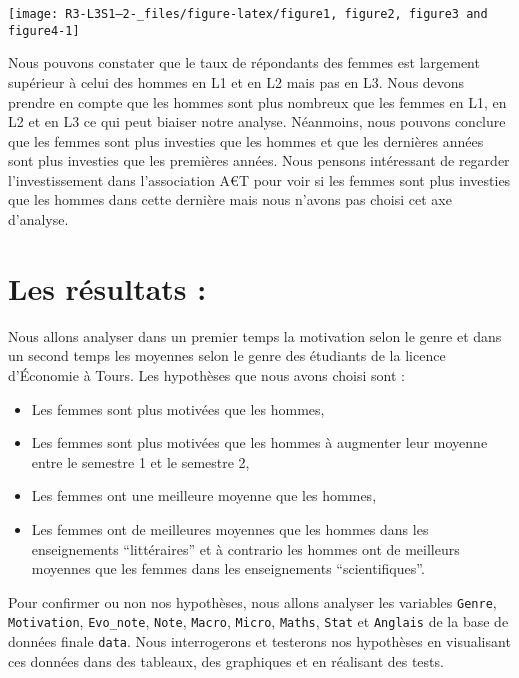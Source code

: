 \documentclass[
  11pt,
  french,
]{article}
\providecommand{\tightlist}{%
  \setlength{\itemsep}{0pt}\setlength{\parskip}{0pt}}
\begin{document}
\begin{center}\texttt{[image: R3-L3S1--2-\_files/figure-latex/figure1, figure2, figure3 and figure4-1]} \end{center}

Nous pouvons constater que le taux de répondants des femmes est
largement supérieur à celui des hommes en L1 et en L2 mais pas en L3.
Nous devons prendre en compte que les hommes sont plus nombreux que les
femmes en L1, en L2 et en L3 ce qui peut biaiser notre analyse.
Néanmoins, nous pouvons conclure que les femmes sont plus investies que
les hommes et que les dernières années sont plus investies que les
premières années. Nous pensons intéressant de regarder l'investissement
dans l'association A€T pour voir si les femmes sont plus investies que
les hommes dans cette dernière mais nous n'avons pas choisi cet axe
d'analyse.

\hypertarget{les-ruxe9sultats}{%
\section{Les résultats :}\label{les-ruxe9sultats}}

Nous allons analyser dans un premier temps la motivation selon le genre
et dans un second temps les moyennes selon le genre des étudiants de la
licence d'Économie à Tours. Les hypothèses que nous avons choisi sont :

\begin{itemize}
\tightlist
\item
  Les femmes sont plus motivées que les hommes,
\item
  Les femmes sont plus motivées que les hommes à augmenter leur moyenne
  entre le semestre 1 et le semestre 2,
\item
  Les femmes ont une meilleure moyenne que les hommes,
\item
  Les femmes ont de meilleures moyennes que les hommes dans les
  enseignements ``littéraires'' et à contrario les hommes ont de
  meilleurs moyennes que les femmes dans les enseignements
  ``scientifiques''.
\end{itemize}

Pour confirmer ou non nos hypothèses, nous allons analyser les variables
\texttt{Genre}, \texttt{Motivation}, \texttt{Evo\_note}, \texttt{Note},
\texttt{Macro}, \texttt{Micro}, \texttt{Maths}, \texttt{Stat} et
\texttt{Anglais} de la base de données finale \texttt{data}. Nous
interrogerons et testerons nos hypothèses en visualisant ces données
dans des tableaux, des graphiques et en réalisant des tests.
\end{document}
